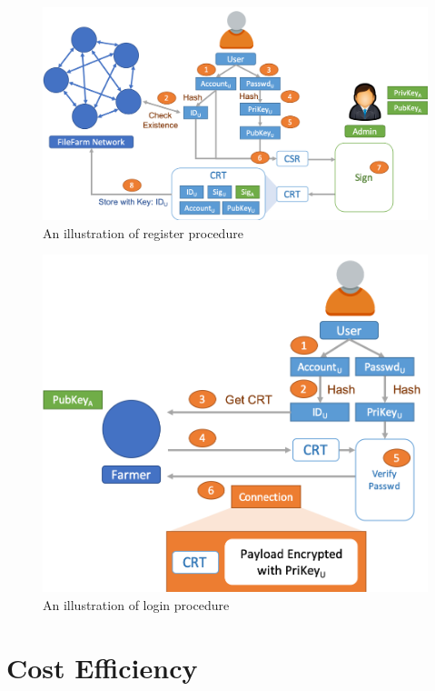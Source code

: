 \begin{figure}[hbt]
  \centering
    \includegraphics[width=14cm]{figures/access_management_register.png}
    \caption{An illustration of register procedure}
    \label{fig:accessmanagementregister}
\end{figure}
  
\begin{figure}[!b]
  \centering
    \includegraphics[width=12cm]{figures/access_management_login.png}
    \caption{An illustration of login procedure}
    \label{fig:accessmanagementlogin}
\end{figure}

\newpage\phantom{blabla}
\newpage\phantom{blabla}

\section{Cost Efficiency}
\label{s:costefficiency}

